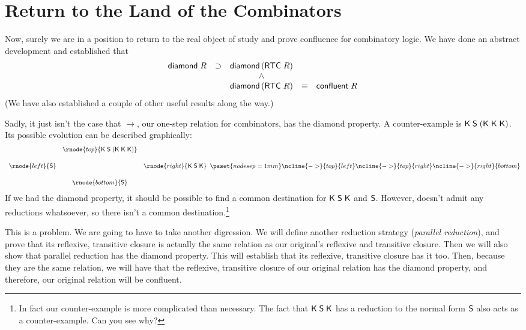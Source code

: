 \documentclass[12pt]{article}
\newcommand{\KC}{\con{K}}
\newcommand{\SC}{\con{S}}
\begin{document}
\section{Return to the Land of the Combinators}
\label{sec:Return-to-Land}

Now, surely we are in a position to return to the real object of study
and prove confluence for combinatory logic.  We have done an abstract
development and established that\[
\begin{array}{ccccc}
{\sf diamond}\;R & \supset & {\sf diamond}\,({\sf RTC}\;R)\\
& & \land\\
& & {\sf diamond}\,({\sf RTC}\;R) & \equiv & {\sf confluent}\;R\\
\end{array}
\]  (We have also established a couple of other useful results along
the way.)

\newcommand{\topk}{\KC\;\SC\;(\KC\;\KC\;\KC)} Sadly, it just isn't the
case that $\rightarrow$, our one-step relation for combinators, has
the diamond property.  A counter-example is $\topk$.  Its possible evolution
can be described graphically: \[
\begin{array}{ccc}
& \rnode{top}{\topk}\\[5mm]
\rnode{left}{\SC} & & \rnode{right}{\KC\;\SC\;\KC}\\[5mm]
& \rnode{bottom}{\SC}
\end{array}
\psset{nodesep=1mm}
\ncline{->}{top}{left}
\ncline{->}{top}{right}
\ncline{->}{right}{bottom}
\]
If we had the diamond property, it should be possible to find a common
destination for $\KC\;\SC\;\KC$ and $\SC$.  However, \SC{} doesn't
admit any reductions whatsoever, so there isn't a common
destination.\footnote{In fact our counter-example is more complicated
  than necessary.  The fact that $\KC\;\SC\;\KC$ has a
  reduction to the normal form $\SC$ also acts as a counter-example.
  Can you see why?}

This is a problem.  We are going to have to take another digression.
We will define another reduction strategy (\emph{parallel reduction}),
and prove that its reflexive, transitive closure is actually the same
relation as our original's reflexive and transitive closure.  Then we
will also show that parallel reduction has the diamond property.  This
will establish that its reflexive, transitive closure has it too.
Then, because they are the same relation, we will have that the
reflexive, transitive closure of our original relation has the diamond
property, and therefore, our original relation will be confluent.
\end{document}
